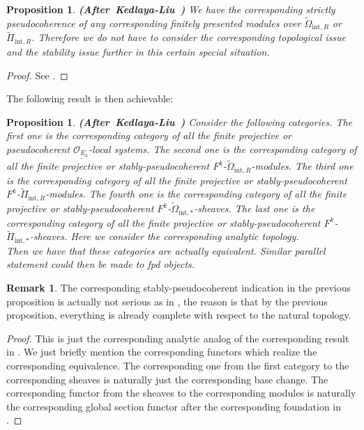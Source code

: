 \documentclass[12pt]{amsart}
\newtheorem{proposition}[theorem]{Proposition}
\theoremstyle{definition}
\newtheorem{remark}[theorem]{Remark}
\numberwithin{equation}{section}
\begin{document}
\begin{proposition} \mbox{\bf{(After Kedlaya-Liu \cite[Lemma 4.5.4]{KL2})}}
We have the corresponding strictly pseudocoherence of any corresponding finitely presented modules over $\widetilde{\Omega}_{\mathrm{int},R}$ or $\widetilde{\Pi}_{\mathrm{int},R}$. Therefore we do not have to consider the corresponding topological issue and the stability issue further in this certain special situation.	
\end{proposition}


\begin{proof}
See \cite[Lemma 4.5.4]{KL2}.	
\end{proof}



\indent The following result is then achievable:


\begin{proposition}\mbox{\bf{(After Kedlaya-Liu \cite[Theorem 4.5.7]{KL2})}}
Consider the following categories. The first one is the corresponding category of all the finite projective or pseudocoherent $\underline{\mathcal{O}_{E_k}}$-local systems. The second one is the corresponding category of all the finite projective or stably-pseudocoherent $F^k$-$\widetilde{\Omega}_{\mathrm{int},R}$-modules. The third one is the corresponding category of all the finite projective or stably-pseudocoherent $F^k$-$\widetilde{\Pi}_{\mathrm{int},R}$-modules. The fourth one is the corresponding category of all the finite projective or stably-pseudocoherent $F^k$-$\widetilde{\Omega}_{\mathrm{int},*}$-sheaves. The last one is the corresponding category of all the finite projective or stably-pseudocoherent $F^k$-$\widetilde{\Pi}_{\mathrm{int},*}$-sheaves. Here we consider the corresponding analytic topology. \\
\indent Then we have that these categories are actually equivalent. Similar parallel statement could then be made to fpd objects.	
\end{proposition}


\begin{remark}
The corresponding stably-pseudocoherent indication in the previous proposition is actually not serious as in \cite[Lemma 4.5.7]{KL2}, the reason is that by the previous proposition, everything is already complete with respect to the natural topology.	
\end{remark}

\begin{proof}
This is just the corresponding analytic analog of the corresponding result in \cite[Lemma 4.5.7]{KL2}. We just briefly mention the corresponding functors which realize the corresponding equivalence. The corresponding one from the first category to the corresponding sheaves is naturally just the corresponding base change. The corresponding functor from the sheaves to the corresponding modules is naturally the corresponding global section functor after the corresponding foundation in \cite[Theorem 1.4.2, Theorem 1.4.18]{Ked1}. 
\end{proof}
\end{document}
